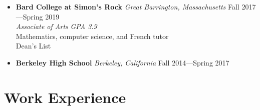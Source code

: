 \documentclass[12pt,letterpaper]{article}
\begin{document}
\begin{itemize}[label=]
    \item
        \textbf{Bard College at Simon's Rock} \textit{Great Barrington, Massachusetts} \hfill Fall 2017---Spring 2019\\
        \textit{Associate of Arts} \hfill \textit{GPA 3.9}\\
        Mathematics, computer science, and French tutor\\
        Dean's List

    \item 
        \textbf{Berkeley High School} \textit{Berkeley, California} \hfill Fall 2014---Spring 2017

\end{itemize}

\section*{Work Experience} \vspace{-0.5em}
\end{document}
